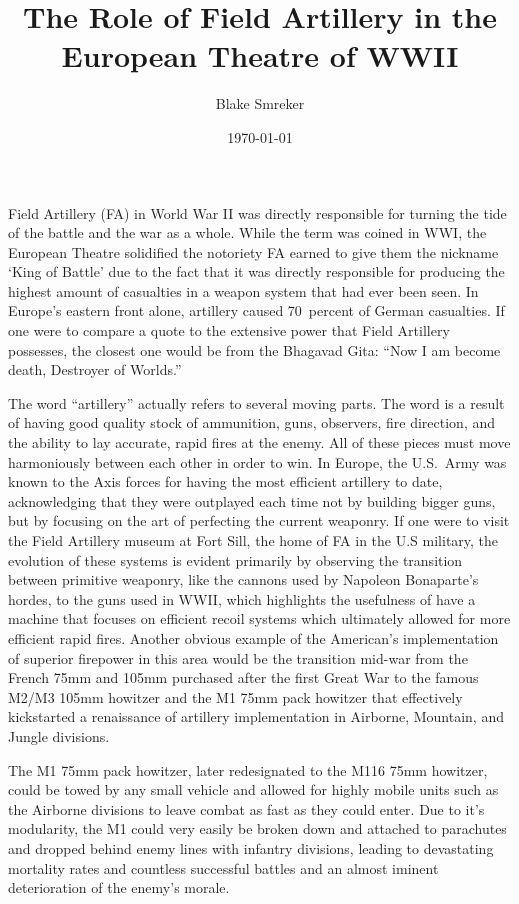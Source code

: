\documentclass[12pt]{article}
\title{The Role of Field Artillery in the European Theatre of WWII}
\author{Blake Smreker}
\date{\today}
\begin{document}
\maketitle

Field Artillery (FA) in World War II was directly responsible for turning the tide of the battle and the war as a whole.
While the term was coined in WWI, the European Theatre solidified the notoriety FA earned to give them the nickname
`King of Battle' due to the fact that it was directly responsible for producing the highest amount of casualties in a
weapon system that had ever been seen. In Europe's eastern front alone, artillery caused 70~percent of German
casualties. If one were to compare a quote to the extensive power that Field Artillery possesses, the closest one would be
from the Bhagavad Gita: ``Now I am become death, Destroyer of Worlds.''

\vspace{1.0\baselineskip}

The word ``artillery'' actually refers to several moving parts. The word is a result of having good quality stock of
ammunition, guns, observers, fire direction, and the ability to lay accurate, rapid fires at the enemy. All of these pieces
must move harmoniously between each other in order to win. In Europe, the U.S.\ Army was known to the Axis forces for having
the most efficient artillery to date, acknowledging that they were outplayed each time not by building bigger guns, but by
focusing on the art of perfecting the current weaponry. If one were to visit the Field Artillery museum at Fort Sill, the
home of FA in the U.S military, the evolution of these systems is evident primarily by observing the transition between
primitive weaponry, like the cannons used by Napoleon Bonaparte's hordes, to the guns used in WWII, which highlights the
usefulness of have a machine that focuses on efficient recoil systems which ultimately allowed for more efficient rapid fires.
Another obvious example of the American's implementation of superior firepower in this area would be the transition mid-war
from the French 75mm and 105mm purchased after the first Great War to the famous M2/M3 105mm howitzer and the M1 75mm pack howitzer
that effectively kickstarted a renaissance of artillery implementation in Airborne, Mountain, and Jungle divisions.

\vspace{1.0\baselineskip}

The M1 75mm pack howitzer, later redesignated to the M116 75mm howitzer, could be towed by any small vehicle and allowed for
highly mobile units such as the Airborne divisions to leave combat as fast as they could enter. Due to it's modularity, the M1
could very easily be broken down and attached to parachutes and dropped behind enemy lines with infantry divisions, leading to
devastating mortality rates and countless successful battles and an almost iminent deterioration of the enemy's morale. 
\end{document}
